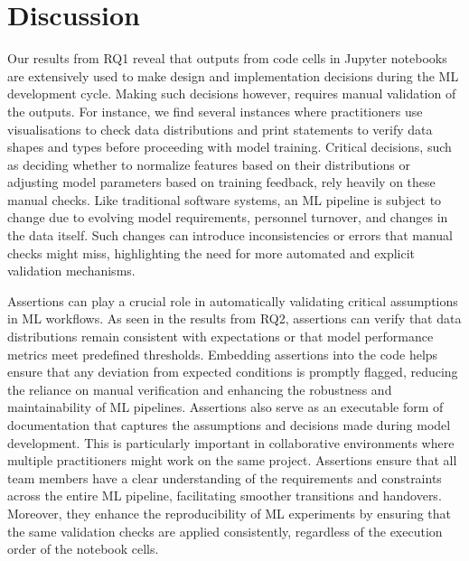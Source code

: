 
\section{Discussion}\label{sec:discuss}

Our results from RQ1 reveal that outputs from code cells in Jupyter notebooks are extensively used to make design and implementation decisions during the ML development cycle. Making such decisions however, requires manual validation of the outputs. For instance, we find several instances where practitioners use visualisations to check data distributions and print statements to verify data shapes and types before proceeding with model training. Critical decisions, such as deciding whether to normalize features based on their distributions or adjusting model parameters based on training feedback, rely heavily on these manual checks. Like traditional software systems, an ML pipeline is subject to change due to evolving model requirements, personnel turnover, and changes in the data itself. Such changes can introduce inconsistencies or errors that manual checks might miss, highlighting the need for more automated and explicit validation mechanisms.

Assertions can play a crucial role in automatically validating critical assumptions in ML workflows. As seen in the results from RQ2, assertions can verify that data distributions remain consistent with expectations or that model performance metrics meet predefined thresholds. Embedding assertions into the code helps ensure that any deviation from expected conditions is promptly flagged, reducing the reliance on manual verification and enhancing the robustness and maintainability of ML pipelines. Assertions also serve as an executable form of documentation that captures the assumptions and decisions made during model development. This is particularly important in collaborative environments where multiple practitioners might work on the same project. Assertions ensure that all team members have a clear understanding of the requirements and constraints across the entire ML pipeline, facilitating smoother transitions and handovers. Moreover, they enhance the reproducibility of ML experiments by ensuring that the same validation checks are applied consistently, regardless of the execution order of the notebook cells.

